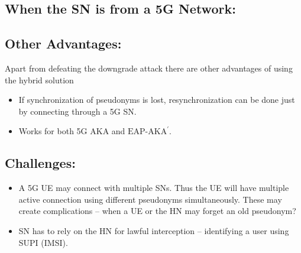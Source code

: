 \documentclass[portrait,a0]{a0poster}
\begin{document}
\begin{multicols}{2}
 
\begin{center}
    
\end{center}
 

 \subsection*{When the SN is from a 5G Network:}
 

\begin{center}
    
\end{center}



\subsection*{Other Advantages:}
Apart from defeating the downgrade attack there are other advantages of using the hybrid solution
\begin{itemize}
\item If synchronization of pseudonyms is lost, resynchronization can be done just by connecting through a 5G SN.
\item Works for both 5G AKA and $\text{EAP-AKA}^{'}$.
\end{itemize}

\subsection*{Challenges:}
\begin{itemize}
 \item A 5G UE may connect with multiple SNs. Thus the UE will have multiple active connection using different pseudonyms simultaneously. These may create complications -- when a UE or the HN may forget an old pseudonym?
 \item SN has to rely on the HN for lawful interception -- identifying a user using SUPI (IMSI). 
\end{itemize}


%
%

\end{multicols}
\end{document}
